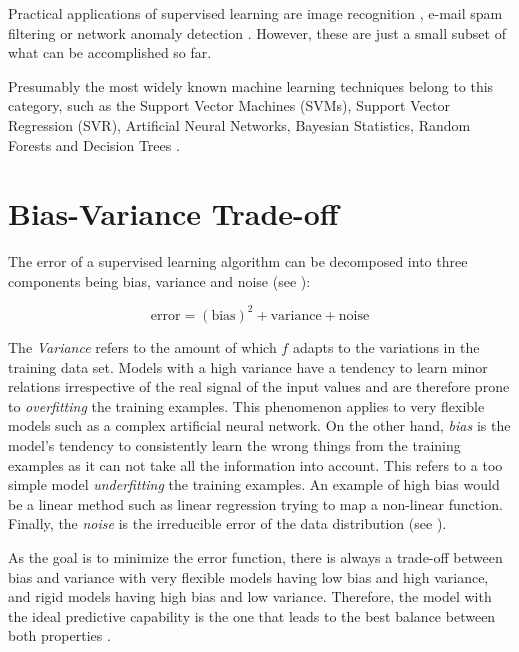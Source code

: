Practical applications of supervised learning are image recognition \cite{simonyan2014very, lecun1990handwritten}, e-mail spam filtering \cite{guzella2009review} or network anomaly detection \cite{lee2010uncovering}. However, these are just a small subset of what can be accomplished so far.

Presumably the most widely known machine learning techniques belong to this category, such as the Support Vector Machines (SVMs), Support Vector Regression (SVR), Artificial Neural Networks, Bayesian Statistics, Random Forests and Decision Trees \cite{Duda:2000:PC:954544}.

\section{Bias-Variance Trade-off}
The error of a supervised learning algorithm can be decomposed into three components being bias, variance and noise (see \cite{efron_hastie_2016}):

\begin{equation}
  \text{error} = (\text{bias})^2 + \text{variance} + \text{noise}
\end{equation}

The \textit{Variance} refers to the amount of which $f$ adapts to the variations in the training data set. Models with a high variance have a tendency to learn minor relations irrespective of the real signal of the input values and are therefore prone to \textit{overfitting} the training examples. This phenomenon applies to very flexible models such as a complex artificial neural network. On the other hand, \textit{bias} is the model's tendency to consistently learn the wrong things from the training examples as it can not take all the information into account. This refers to a too simple model \textit{underfitting} the training examples. An example of high bias would be a linear method such as linear regression trying to map a non-linear function. Finally, the \textit{noise} is the irreducible error of the data distribution (see \cite{James:2014:ISL:2517747}).

As the goal is to minimize the error function, there is always a trade-off between bias and variance with very flexible models having low bias and high variance, and rigid models having high bias and low variance. Therefore, the model with the ideal predictive capability is the one that leads to the best balance between both properties \cite{Duda:2000:PC:954544}.

